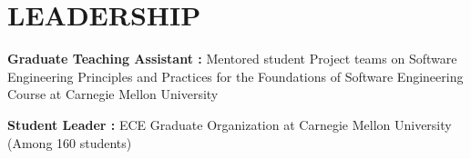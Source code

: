 \documentclass[letterpaper]{article}
\newcommand{\shortSection}[1]{
    \vspace{-6pt}
    \section{#1}
}
\newcommand*{\skill}[2]{
  \textbf{#1 : }#2 \\
  \vspace{1pt}
}
\begin{document}
\shortSection{LEADERSHIP}
\skill{Graduate Teaching Assistant}{Mentored student Project teams on Software Engineering Principles and Practices for the Foundations of Software Engineering Course at Carnegie Mellon University}
\vspace{4pt}
\skill{Student Leader}{ECE Graduate Organization at Carnegie Mellon University (Among 160 students)}
\end{document}
